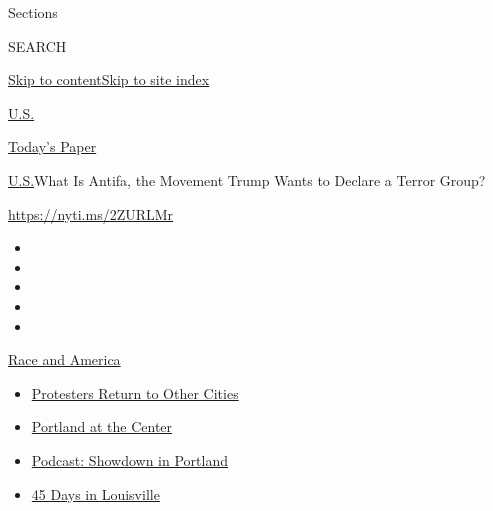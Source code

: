 Sections

SEARCH

\protect\hyperlink{site-content}{Skip to
content}\protect\hyperlink{site-index}{Skip to site index}

\href{https://www.nytimes3xbfgragh.onion/section/us}{U.S.}

\href{https://myaccount.nytimes3xbfgragh.onion/auth/login?response_type=cookie\&client_id=vi}{}

\href{https://www.nytimes3xbfgragh.onion/section/todayspaper}{Today's
Paper}

\href{/section/us}{U.S.}\textbar{}What Is Antifa, the Movement Trump
Wants to Declare a Terror Group?

\href{https://nyti.ms/2ZURLMr}{https://nyti.ms/2ZURLMr}

\begin{itemize}
\item
\item
\item
\item
\item
\end{itemize}

\href{https://www.nytimes3xbfgragh.onion/news-event/george-floyd-protests-minneapolis-new-york-los-angeles?action=click\&pgtype=Article\&state=default\&region=TOP_BANNER\&context=storylines_menu}{Race
and America}

\begin{itemize}
\tightlist
\item
  \href{https://www.nytimes3xbfgragh.onion/2020/07/26/us/protests-portland-seattle-trump.html?action=click\&pgtype=Article\&state=default\&region=TOP_BANNER\&context=storylines_menu}{Protesters
  Return to Other Cities}
\item
  \href{https://www.nytimes3xbfgragh.onion/2020/07/24/us/portland-oregon-protests-white-race.html?action=click\&pgtype=Article\&state=default\&region=TOP_BANNER\&context=storylines_menu}{Portland
  at the Center}
\item
  \href{https://www.nytimes3xbfgragh.onion/2020/07/23/podcasts/the-daily/portland-protests.html?action=click\&pgtype=Article\&state=default\&region=TOP_BANNER\&context=storylines_menu}{Podcast:
  Showdown in Portland}
\item
  \href{https://www.nytimes3xbfgragh.onion/interactive/2020/07/16/us/black-lives-matter-protests-louisville-breonna-taylor.html?action=click\&pgtype=Article\&state=default\&region=TOP_BANNER\&context=storylines_menu}{45
  Days in Louisville}
\end{itemize}

